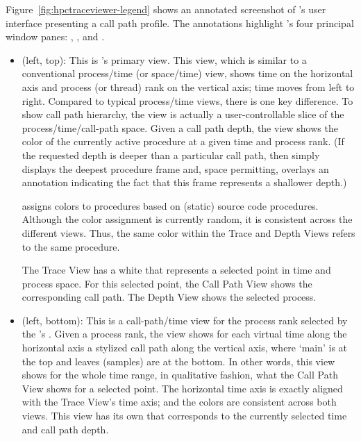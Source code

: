 Figure~\ref{fig:hpctraceviewer-legend} shows an annotated screenshot of \hpctraceviewer{}'s user interface presenting a call path profile.
The annotations highlight \hpctraceviewer{}'s four principal window panes: \traceview, \depthview, \callview{} and \miniview.

\begin{itemize}
\item \textbf{\traceview} (left, top):
  This is \hpctraceviewer{}'s primary view.
  This view, which is similar to a conventional process/time (or space/time) view, shows time on the horizontal axis and process (or thread) rank on the vertical axis; time moves from left to right.
  Compared to typical process/time views, there is one key difference.
  To show call path hierarchy, the view is actually a user-controllable slice of the process/time/call-path space.
  Given a call path depth, the view shows the color of the currently active procedure at a given time and process rank.
  (If the requested depth is deeper than a particular call path, then \hpctraceviewer{} simply displays the deepest procedure frame and, space permitting, overlays an annotation indicating the fact that this frame represents a shallower depth.)

  \hpctraceviewer{} assigns colors to procedures based on (static) source code procedures.
  Although the color assignment is currently random, it is consistent across the different views.
  Thus, the same color within the Trace and Depth Views refers to the same procedure.

  The Trace View has a white \crosshair{} that represents a selected point in time and process space.
  For this selected point, the Call Path View shows the corresponding call path.
  The Depth View shows the selected process.

\item \textbf{\depthview} (left, bottom):
  This is a call-path/time view for the process rank selected by the \traceview's \crosshair{}.
  Given a process rank, the view shows for each virtual time along the horizontal axis a stylized call path along the vertical axis, where `main' is at the top and leaves (samples) are at the bottom.
  In other words, this view shows for the whole time range, in qualitative fashion, what the Call Path View shows for a selected point.
  The horizontal time axis is exactly aligned with the Trace View's time axis; and the colors are consistent across both views.
  This view has its own \crosshair{} that corresponds to the currently selected time and call path depth.


\end{itemize}
